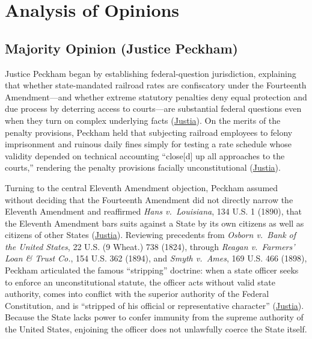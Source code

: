 \documentclass[12pt]{article}
\begin{document}
\section{Analysis of Opinions}

\subsection{Majority Opinion (Justice Peckham)}

Justice Peckham began by establishing federal-question jurisdiction, explaining that whether state-mandated railroad rates are confiscatory under the Fourteenth Amendment---and whether extreme statutory penalties deny equal protection and due process by deterring access to courts---are substantial federal questions even when they turn on complex underlying facts (\href{https://supreme.justia.com/cases/federal/us/209/123/}{Justia}). On the merits of the penalty provisions, Peckham held that subjecting railroad employees to felony imprisonment and ruinous daily fines simply for testing a rate schedule whose validity depended on technical accounting ``close[d] up all approaches to the courts,'' rendering the penalty provisions facially unconstitutional (\href{https://supreme.justia.com/cases/federal/us/209/123/}{Justia}).

Turning to the central Eleventh Amendment objection, Peckham assumed without deciding that the Fourteenth Amendment did not directly narrow the Eleventh Amendment and reaffirmed \textit{Hans v.\ Louisiana}, 134 U.S. 1 (1890), that the Eleventh Amendment bars suits against a State by its own citizens as well as citizens of other States (\href{https://supreme.justia.com/cases/federal/us/209/123/}{Justia}). Reviewing precedents from \textit{Osborn v.\ Bank of the United States}, 22 U.S. (9 Wheat.) 738 (1824), through \textit{Reagan v.\ Farmers' Loan \& Trust Co.}, 154 U.S. 362 (1894), and \textit{Smyth v.\ Ames}, 169 U.S. 466 (1898), Peckham articulated the famous ``stripping'' doctrine: when a state officer seeks to enforce an unconstitutional statute, the officer acts without valid state authority, comes into conflict with the superior authority of the Federal Constitution, and is ``stripped of his official or representative character'' (\href{https://supreme.justia.com/cases/federal/us/209/123/}{Justia}). Because the State lacks power to confer immunity from the supreme authority of the United States, enjoining the officer does not unlawfully coerce the State itself.
\end{document}
